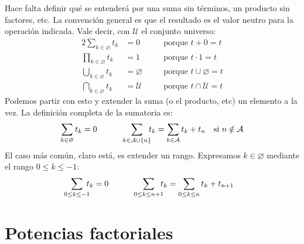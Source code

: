   Hace falta definir qué se entenderá por una suma sin términos,
  un producto sin factores,
  etc.%
  La convención general es que el resultado es el valor neutro
  para la operación indicada.
  Vale decir,
  con \(\mathcal{U}\) el conjunto universo:
  \begin{alignat*}{2}
    \sum_{k \in \varnothing}  t_k
      &= 0
	& \quad & \text{porque \(t + 0 = t\)} \\
    \prod_{k \in \varnothing} t_k
      &= 1
	&& \text{porque \(t \cdot 1 = t\)} \\
    \bigcup_{k \in \varnothing} t_k
      &= \varnothing
	&& \text{porque \(t \cup \varnothing = t\)} \\
    \bigcap_{k \in \varnothing} t_k
      &= \mathcal{U}
	&& \text{porque \(t \cap \mathcal{U} = t\)}
  \end{alignat*}
  Podemos partir con esto y extender la suma
  (o el producto, etc)
  un elemento a la vez.
  La definición completa de la sumatoria es:
  \begin{equation*}
    \sum_{k \in \varnothing} t_k
      = 0
    \hspace{4em}
    \sum_{\mathclap{k \in \mathcal{A} \cup \{n\}}} \;\; t_k
      = \sum_{k \in \mathcal{A}} t_k + t_n
	   \quad \text{si \(n \notin \mathcal{A}\)}
  \end{equation*}
  El caso más común,
  claro está,
  es extender un rango.
  Expresamos \(k \in \varnothing\)
  mediante el rango \(0 \le k \le -1\):
  \begin{equation*}
    \sum_{\mathclap{0 \le k \le -1}} \; t_k
      = 0
   \hspace{4em}
   \sum_{\mathclap{0 \le k \le n + 1}} \;\; t_k
      = \sum_{0 \le k \le n} t_k + t_{n + 1}
  \end{equation*}

\section{Potencias factoriales}
\label{sec:preliminares-potencias-factoriales}

